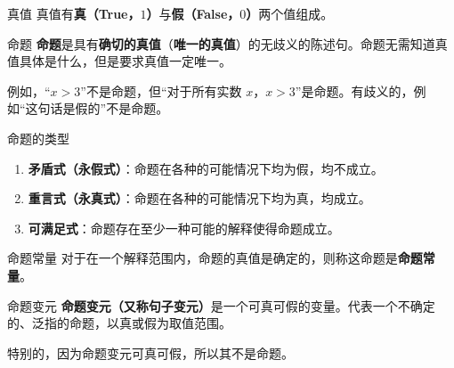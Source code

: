 
\begin{definition}{真值}
真值有\textbf{真（True，$1$）}与\textbf{假（False，$0$）}两个值组成。
\end{definition}

\begin{definition}{命题}
\textbf{命题}是具有\textbf{确切的真值}（\textbf{唯一的真值}）的无歧义的陈述句。命题无需知道真值具体是什么，但是要求真值一定唯一。
\end{definition}
例如，“$x>3$”不是命题，但“对于所有实数 $x$，$x>3$”是命题。有歧义的，例如“这句话是假的”不是命题。

\begin{definition}{命题的类型}
\begin{enumerate}
\item \textbf{矛盾式（永假式）}：命题在各种的可能情况下均为假，均不成立。
\item \textbf{重言式（永真式）}：命题在各种的可能情况下均为真，均成立。
\item \textbf{可满足式}：命题存在至少一种可能的解释使得命题成立。
\end{enumerate}

\end{definition}

\begin{definition}{命题常量}
对于在一个解释范围内，命题的真值是确定的，则称这命题是\textbf{命题常量}。
\end{definition}
\begin{definition}{命题变元}
\textbf{命题变元（又称句子变元）}是一个可真可假的变量。代表一个不确定的、泛指的命题，以真或假为取值范围。
\end{definition}
特别的，因为命题变元可真可假，所以其不是命题。